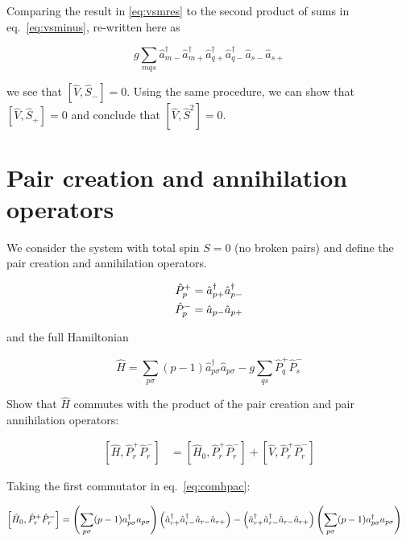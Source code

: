 \documentclass[11pt]{article}
\newcommand{\cop}[2]{%
	\ensuremath{ \hat{a} _{#1 #2} ^{\dagger} }}
\newcommand{\aop}[2]{%
	\ensuremath{ \hat{a} _{#1 #2} }}
\newcommand{\pcop}[1]{%
	\ensuremath{ \cop{#1}{+} \cop{#1}{-} } }
\newcommand{\paop}[1]{%
	\ensuremath{ \aop{#1}{-} \aop{#1}{+} } }
\newcommand{\hzero}[2]{%
	\ensuremath{ \sum_{#1 #2} (#1-1) a _{#1 #2} ^{\dagger} a _{#1 #2} }}
\newcommand{\hfull}[4]{%
	\ensuremath{\sum_{#1 #2} (#1 - 1) \cop{#1}{#2} \aop{#1}{#2} - g \sum_{#3 #4} \hat{P} ^+ _{#3} \hat{P} ^- _{#4}  } }
\newcommand{\sop}[1]{%
	\ensuremath{ \hat{S}_{#1} } }
\newcommand{\hop}{
	\ensuremath{ \hat{H} _0 }}
\newcommand{\ssop}{
	\ensuremath{ \hat{S} ^2} }
\newcommand{\vop}{
	\ensuremath{ \hat{V} } }
\newcommand{\ppop}[1]{%
	\ensuremath{ \hat{P} _{#1} ^+ } }
\newcommand{\pmop}[1]{%
	\ensuremath{ \hat{P} _{#1} ^- } }
\newcommand{\commutator}[2]{%
	\ensuremath{ \left [ #1,#2 \right ] }}
\begin{document}
Comparing the result in \ref{eq:vsmres} to the second product of sums in eq.~\ref{eq:vsminus}, re-written here as

\begin{equation}
	g \sum _{m q s} \cop{m}{-} \cop{m}{+} \cop{q}{+} \cop{q}{-} \aop{s}{-} \aop{s}{+} \nonumber
\end{equation}

we see that $ \commutator{\vop}{\sop{-}} = 0$. Using the same procedure, we can show that $ \commutator{\vop}{\sop{+}} = 0$ and conclude that $ \commutator{\vop}{\ssop} = 0$.

\section*{Pair creation and annihilation operators}

We consider the system with total spin $S=0$ (no broken pairs) and define the pair creation and annihilation operators.

\begin{align*}
\begin{split}
	\hat{P} _p ^+ &= \pcop{p}\\
	\hat{P} _p ^- &= \paop{p}
\end{split}
\end{align*}

and the full Hamiltonian

\begin{equation}
	\hat{H} = \hfull{p}{\sigma}{q}{s}
\label{eq:fullham}
\end{equation}

Show that $\hat{H}$ commutes with the product of the pair creation and pair annihilation operators:


\begin{align}\label{eq:comhpac}
	\commutator{\hat{H}}{ \ppop{r} \pmop{r}} &= \commutator{\hat{H} _0}{ \ppop{r} \pmop{r}} + \commutator{\vop}{\ppop{r} \pmop{r}}
\end{align}

Taking the first commutator in eq.~\ref{eq:comhpac}:

\begin{align*}
	\commutator{\hop}{ \ppop{r} \pmop{r}} &= \left ( \hzero{p}{\sigma} \right ) \left ( \pcop{r} \paop{r} \right ) - \left ( \pcop{r} \paop{r} \right ) \left ( \hzero{p}{\sigma} \right )
\end{align*}
\end{document}
